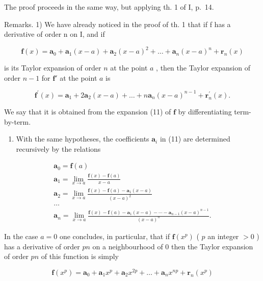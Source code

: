 The proof proceeds in the same way, but applying th. 1 of I, p.~14.

Remarks. 1) We have already noticed in the proof of th. 1 that if f has a derivative of order n on I, and if

\[
\mathbf {f} (x) = \mathbf {a} _ {0} + \mathbf {a} _ {1} (x - a) + \mathbf {a} _ {2} (x - a) ^ {2} + \dots + \mathbf {a} _ {n} (x - a) ^ {n} + \mathbf {r} _ {n} (x)\tag{11}
\]

is its Taylor expansion of order \(n\) at the point \(a\) , then the Taylor expansion of order \(n - 1\) for \(\mathbf{f}'\) at the point \(a\) is

\[
\mathbf {f} ^ {\prime} (x) = \mathbf {a} _ {1} + 2 \mathbf {a} _ {2} (x - a) + \dots + n \mathbf {a} _ {n} (x - a) ^ {n - 1} + \mathbf {r} _ {n} ^ {\prime} (x).\tag{12}
\]

We say that it is obtained from the expansion (11) of \(\mathbf{f}\) by differentiating term-by-term.

\begin{enumerate}
\def\labelenumi{\arabic{enumi})}
\setcounter{enumi}{1}
\tightlist
\item
  With the same hypotheses, the coefficients \(\mathbf{a}_i\) in (11) are determined recursively by the relations
\end{enumerate}

\[
\begin{array}{l} \mathbf {a} _ {0} = \mathbf {f} (a) \\ \mathbf {a} _ {1} = \lim _ {x \to a} \frac {\mathbf {f} (x) - \mathbf {f} (a)}{x - a} \\ \mathbf {a} _ {2} = \lim _ {x \to a} \frac {\mathbf {f} (x) - \mathbf {f} (a) - \mathbf {a} _ {1} (x - a)}{(x - a) ^ {2}} \\ \dots \\ \mathbf {a} _ {n} = \lim _ {x \to a} \frac {\mathbf {f} (x) - \mathbf {f} (a) - \mathbf {a} _ {1} (x - a) - \cdots - \mathbf {a} _ {n - 1} (x - a) ^ {n - 1}}{(x - a) ^ {n}}. \end{array}
\]

In the case \(a = 0\) one concludes, in particular, that if \(\mathbf{f}(x^p)\) ( \(p\) an integer \(> 0\) ) has a derivative of order \(pn\) on a neighbourhood of 0 then the Taylor expansion of order \(pn\) of this function is simply

\[
\mathbf {f} (x ^ {p}) = \mathbf {a} _ {0} + \mathbf {a} _ {1} x ^ {p} + \mathbf {a} _ {2} x ^ {2 p} + \dots + \mathbf {a} _ {n} x ^ {n p} + \mathbf {r} _ {n} (x ^ {p})\tag{13}
\]

